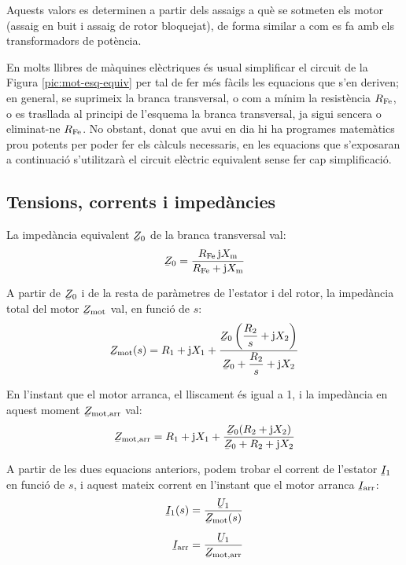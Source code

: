Aquests valors es determinen a partir dels assaigs a què se sotmeten els motor (assaig en buit i assaig de rotor bloquejat), de forma similar a com es fa amb els transformadors de potència.

En molts llibres de màquines elèctriques és usual simplificar el circuit de la Figura  \vref{pic:mot-esq-equiv} per tal de fer més fàcils les equacions que s'en deriven; en general, se suprimeix la branca transversal, o com a mínim la resistència $R_\mathrm{Fe}$, o es trasllada al principi de l'esquema la branca transversal, ja sigui sencera o eliminat-ne  $R_\mathrm{Fe}$. No obstant, donat que avui en dia hi ha programes matemàtics prou potents per poder fer els càlculs necessaris, en les equacions que s'exposaran a continuació s'utilitzarà el circuit elèctric equivalent sense fer cap simplificació.

\subsection{Tensions, corrents i impedàncies}

La impedància equivalent $\cmplx{Z}_0$ de la branca transversal val:
\begin{equation}
    \cmplx{Z}_0 = \frac{R\ped{Fe} \, \ju X\ped{m}}{ R\ped{Fe} + \ju X\ped{m}}\label{eq:mot-Z0}
\end{equation}

A partir de $\cmplx{Z}_0$ i de la resta de paràmetres de l'estator i del rotor, la impedància total del motor $\cmplx{Z}\ped{mot}$ val,  en funció de $s$:
\begin{equation}
    \cmplx{Z}\ped{mot}(s) = R_1 + \ju X_1 + \frac{\cmplx{Z}_0 \left( \dfrac{R_2}{s} + \ju X_2\right)}{\cmplx{Z}_0 +  \dfrac{R_2}{s} + \ju X_2}
\end{equation}

En l'instant que el motor arranca, el lliscament és igual a 1, i la impedància en aquest moment $\cmplx{Z}\ped{mot,arr}$ val:
\begin{equation}
    \cmplx{Z}\ped{mot,arr} = R_1 + \ju X_1 + \frac{\cmplx{Z}_0 ( R_2 + \ju X_2)}{\cmplx{Z}_0 +  R_2 + \ju X_2}\label{eq:mot-Zmot}
\end{equation}

A partir de les dues equacions anteriors, podem trobar el corrent de l'estator  $\cmplx{I}_1$ en funció de $s$, i aquest mateix corrent en l'instant que el motor arranca $\cmplx{I}\ped{arr}$:
\begin{subequations}\index{motors d'inducció!corrent d'arrancada}
\begin{align}
    \cmplx{I}_1(s) &= \frac{\cmplx{U}_1}{\cmplx{Z}\ped{mot}(s)} \\[1ex]
    \cmplx{I}\ped{arr} &= \frac{\cmplx{U}_1}{\cmplx{Z}\ped{mot,arr}}
\end{align}
\end{subequations}

